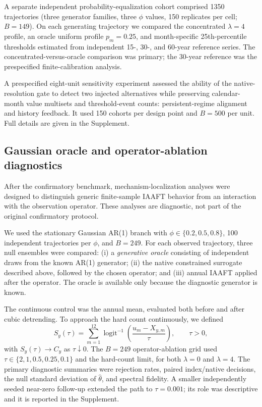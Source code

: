A separate independent probability-equalization cohort comprised 1350 trajectories (three generator families, three $\phi$ values, 150 replicates per cell; $B=149$). On each generating trajectory we compared the concentrated $\lambda=4$ profile, an oracle uniform profile $p_m=0.25$, and month-specific 25th-percentile thresholds estimated from independent 15-, 30-, and 60-year reference series. The concentrated-versus-oracle comparison was primary; the 30-year reference was the prespecified finite-calibration analysis.

A prespecified eight-unit sensitivity experiment assessed the ability of the native-resolution gate to detect two injected alternatives while preserving calendar-month value multisets and threshold-event counts: persistent-regime alignment and history feedback. It used 150 cohorts per design point and $B=500$ per unit. Full details are given in the Supplement.

\subsection{Gaussian oracle and operator-ablation diagnostics}\label{sec:ablationmethods}

After the confirmatory benchmark, mechanism-localization analyses were designed to distinguish generic finite-sample IAAFT behavior from an interaction with the observation operator. These analyses are diagnostic, not part of the original confirmatory protocol.

We used the stationary Gaussian AR(1) branch with $\phi\in\{0.2,0.5,0.8\}$, 100 independent trajectories per $\phi$, and $B=249$. For each observed trajectory, three null ensembles were compared: (i) a \emph{generative oracle} consisting of independent draws from the known AR(1) generator; (ii) the native constrained surrogate described above, followed by the chosen operator; and (iii) annual IAAFT applied after the operator. The oracle is available only because the diagnostic generator is known.

The continuous control was the annual mean, evaluated both before and after cubic detrending. To approach the hard count continuously, we defined
\begin{equation}
S_y(\tau)=\sum_{m=1}^{12}
\operatorname{logit}^{-1}\!\left(\frac{u_m-X_{y,m}}{\tau}\right),\qquad \tau>0,
\label{eq:soft}
\end{equation}
with $S_y(\tau)\to C_y$ as $\tau\downarrow0$. The $B=249$ operator-ablation grid used $\tau\in\{2,1,0.5,0.25,0.1\}$ and the hard-count limit, for both $\lambda=0$ and $\lambda=4$. The primary diagnostic summaries were rejection rates, paired index/native decisions, the null standard deviation of $\widehat\theta$, and spectral fidelity. A smaller independently seeded near-zero follow-up extended the path to $\tau=0.001$; its role was descriptive and it is reported in the Supplement.

